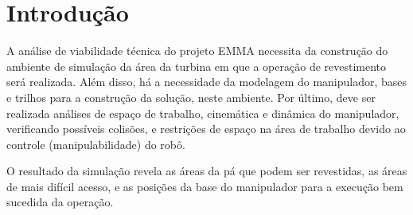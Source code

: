 \section{Introdução}
A análise de viabilidade técnica do projeto EMMA necessita da construção do
ambiente de simulação da área da turbina em que a operação de revestimento será
realizada. Além disso, há a necessidade da modelagem do manipulador, bases e
trilhos para a construção da solução, neste ambiente. Por último, deve ser
realizada análises de espaço de trabalho, cinemática e dinâmica do manipulador,
verificando possíveis colisões, e restrições de espaço na área de trabalho
devido ao controle (manipulabilidade) do robô. 

O resultado da simulação revela as áreas da pá que podem ser revestidas, as
áreas de mais difícil acesso, e as posições da base do manipulador para a
execução bem sucedida da operação.
